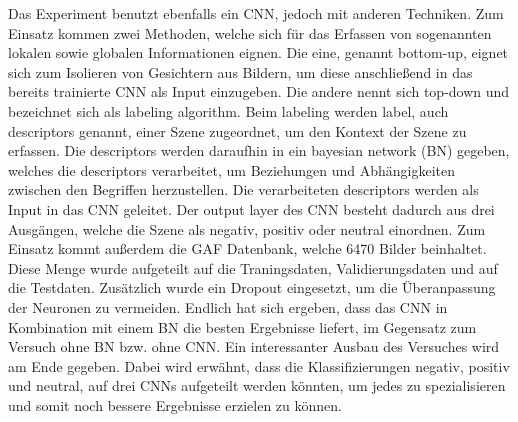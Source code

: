 Das Experiment \cite{wildemotionrec} benutzt ebenfalls ein CNN, jedoch mit anderen Techniken. Zum Einsatz kommen zwei Methoden, welche sich für das Erfassen von sogenannten lokalen sowie globalen Informationen eignen. Die eine, genannt bottom-up, eignet sich zum Isolieren von Gesichtern aus Bildern, um diese anschließend in das bereits trainierte CNN als Input einzugeben. Die andere nennt sich top-down und bezeichnet sich als labeling algorithm. Beim labeling werden label, auch descriptors genannt, einer Szene zugeordnet, um den Kontext der Szene zu erfassen. Die descriptors werden daraufhin in ein bayesian network (BN) \cite{wildemotionrec} gegeben, welches die descriptors verarbeitet, um Beziehungen und Abhängigkeiten zwischen den Begriffen herzustellen. Die verarbeiteten descriptors werden als Input in das CNN geleitet. Der output layer des CNN besteht dadurch aus drei Ausgängen, welche die Szene als negativ, positiv oder neutral einordnen. Zum Einsatz kommt außerdem die GAF Datenbank, welche 6470 Bilder beinhaltet. Diese Menge wurde aufgeteilt auf die Traningsdaten, Validierungsdaten und auf die Testdaten. Zusätzlich wurde ein Dropout eingesetzt, um die Überanpassung der Neuronen zu vermeiden. Endlich hat sich ergeben, dass das CNN in Kombination mit einem BN die besten Ergebnisse liefert, im Gegensatz zum Versuch ohne BN bzw. ohne CNN. Ein interessanter Ausbau des Versuches wird am Ende gegeben. Dabei wird erwähnt, dass die Klassifizierungen negativ, positiv und neutral, auf drei CNNs aufgeteilt werden könnten, um jedes zu spezialisieren und somit noch bessere Ergebnisse erzielen zu können.

